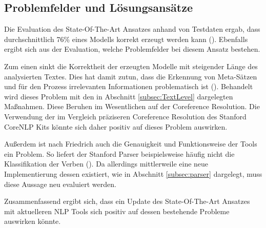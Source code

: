 \subsection{Problemfelder und Lösungsansätze}
Die Evaluation des State-Of-The-Art Ansatzes anhand von Testdaten ergab, dass durchschnittlich 76\% eines Modells korrekt erzeugt werden kann (\cite[vgl.][115]{FRIEDRICH1}). Ebenfalls ergibt sich aus der Evaluation, welche Problemfelder bei diesem Ansatz bestehen.\par Zum einen sinkt die Korrektheit der erzeugten Modelle mit steigender Länge des analysierten Textes. Dies hat damit zutun, dass die Erkennung von Meta-Sätzen und für den Prozess irrelevanten Informationen problematisch ist (\cite[vgl.][116]{FRIEDRICH1}). Behandelt wird dieses Problem mit den in Abschnitt \ref{subsec:TextLevel} dargelegten Maßnahmen. Diese Beruhen im Wesentlichen auf der Coreference Resolution. Die Verwendung der im Vergleich präziseren Coreference Resolution des Stanford CoreNLP Kits könnte sich daher positiv auf dieses Problem auswirken.\par
Außerdem ist nach Friedrich auch die Genauigkeit und Funktionsweise der Tools ein Problem. So liefert der Stanford Parser beispielsweise häufig nicht die Klassifikation der Verben (\cite[vgl.][117 ff.]{FRIEDRICH1}). Da allerdings mittlerweile eine neue Implementierung dessen existiert, wie in Abschnitt \ref{subsec:parser} dargelegt, muss diese Aussage neu evaluiert werden.\par
Zusammenfassend ergibt sich, dass ein Update des State-Of-The-Art Ansatzes mit aktuelleren \ac{NLP} Tools sich positiv auf dessen bestehende Probleme auswirken könnte.


